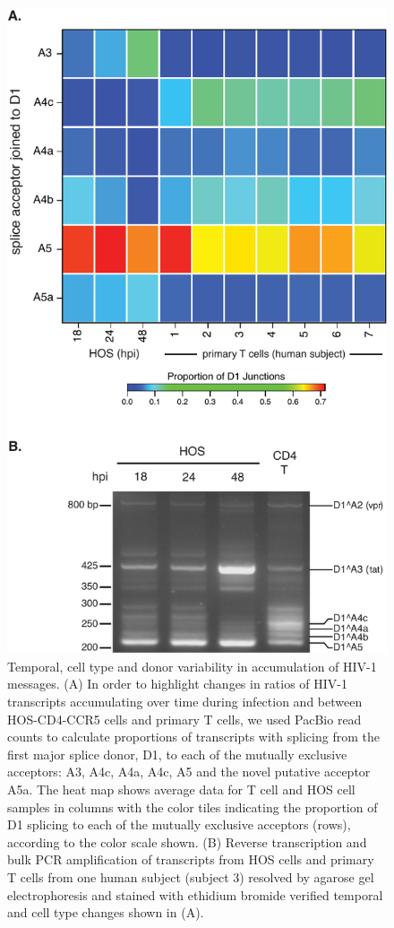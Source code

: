 \documentclass[../sherrill-Mix_thesis.tex]{subfiles}
\begin{document}
\begin{figure}
	\centering
	\includegraphics[width=.6\textwidth]{4.pdf}
	\caption[Temporal, cell type and donor variability in accumulation of HIV-1 messages]{Temporal, cell type and donor variability in accumulation of HIV-1 messages. (A) In order to highlight changes in ratios of HIV-1 transcripts accumulating over time during infection and between HOS-CD4-CCR5 cells and primary T cells, we used PacBio read counts to calculate proportions of transcripts with splicing from the first major splice donor, D1, to each of the mutually exclusive acceptors: A3, A4c, A4a, A4c, A5 and the novel putative acceptor A5a. The heat map shows average data for T cell and HOS cell samples in columns with the color tiles indicating the proportion of D1 splicing to each of the mutually exclusive acceptors (rows), according to the color scale shown. (B) Reverse transcription and bulk PCR amplification of \hivEight{} transcripts from HOS cells and primary T cells from one human subject (subject 3) resolved by agarose gel electrophoresis and stained with ethidium bromide verified temporal and cell type changes shown in (A).}
	\label{figJunctions}
\end{figure}
\end{document}
